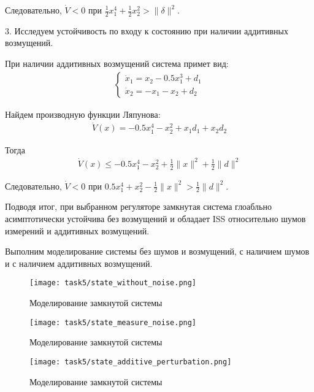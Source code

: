 Следовательно, $\dot{V} < 0$ при $\frac{1}{2}x_1^4 + \frac{1}{2}x_2^2 > \|\delta\|^2$.


3. Исследуем устойчивость по входу к состоянию при наличии
аддитивных возмущений.

При наличии аддитивных возмущений система примет вид:
\begin{align*}
    \begin{cases}
        \dot{x}_1 = x_2 - 0.5x_1^3 + d_1 \\
        \dot{x}_2 = -x_1 - x_2 + d_2
    \end{cases}
\end{align*}

Найдем производную функции Ляпунова:
\begin{align*}
    \dot{V}(x) = -0.5x_1^4 - x_2^2 + x_1d_1 + x_2d_2
\end{align*}

Тогда
\begin{align*}
    \dot{V}(x) \le -0.5x_1^4 - x_2^2 + \frac{1}{2} \|x\|^2 + \frac{1}{2}\|d\|^2
\end{align*}

Следовательно, $\dot{V} < 0$ при $0.5x_1^4 + x_2^2 - \frac{1}{2} \|x\|^2 > \frac{1}{2}\|d\|^2$.

Подводя итог, при выбранном регуляторе замкнутая система 
глоабльно асимптотически устойчива без возмущений и обладает
ISS относительно шумов измерений и аддитивных возмущений.

Выполним моделирование системы без шумов и возмущений, с наличием шумов и с наличием аддитивных возмущений.

\begin{figure}[H]
\centering
\texttt{[image: task5/state\_without\_noise.png]}
\caption{Моделирование замкнутой системы}
\label{fig:state_without_noise}
\end{figure}

\begin{figure}[H]
\centering
\texttt{[image: task5/state\_measure\_noise.png]}
\caption{Моделирование замкнутой системы}
\label{fig:state_measure_noise}
\end{figure}

\begin{figure}[H]
\centering
\texttt{[image: task5/state\_additive\_perturbation.png]}
\caption{Моделирование замкнутой системы}
\label{fig:state_additive_perturbation}
\end{figure}

